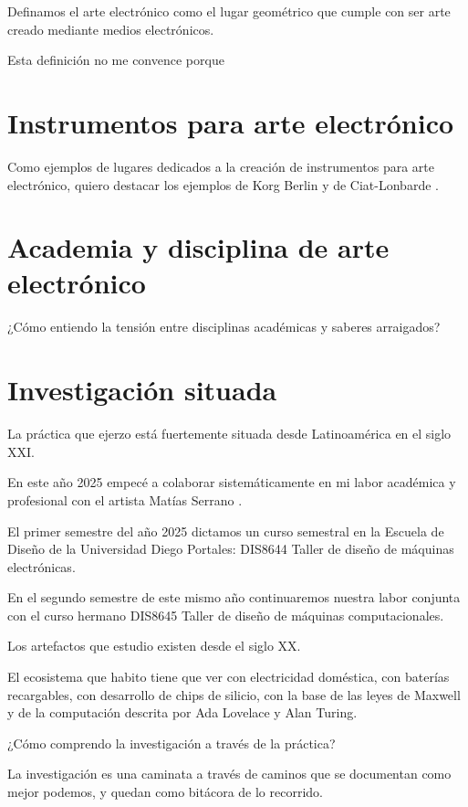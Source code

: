 \documentclass{article}
\begin{document}
Definamos el arte electrónico como el lugar geométrico que cumple con ser arte creado mediante medios electrónicos.

Esta definición no me convence porque 


\section{Instrumentos para arte electrónico}

Como ejemplos de lugares dedicados a la creación de instrumentos para arte electrónico, quiero destacar los ejemplos de Korg Berlin \cite{korgBerlin} y de Ciat-Lonbarde \cite{ciatLonbarde}.

\section{Academia y disciplina de arte electrónico}

¿Cómo entiendo la tensión entre disciplinas académicas y saberes arraigados?

\section{Investigación situada}

La práctica que ejerzo está fuertemente situada desde Latinoamérica en el siglo XXI.

En este año 2025 empecé a colaborar sistemáticamente en mi labor académica y profesional con el artista Matías Serrano \cite{misaa}.

El primer semestre del año 2025 dictamos un curso semestral en la Escuela de Diseño de la Universidad Diego Portales: DIS8644 Taller de diseño de máquinas electrónicas.

En el segundo semestre de este mismo año continuaremos nuestra labor conjunta con el curso hermano DIS8645 Taller de diseño de máquinas computacionales.



Los artefactos que estudio existen desde el siglo XX.

El ecosistema que habito tiene que ver con electricidad doméstica, con baterías recargables, con desarrollo de chips de silicio, con la base de las leyes de Maxwell y de la computación descrita por Ada Lovelace y Alan Turing.

¿Cómo comprendo la investigación a través de la práctica?

La investigación es una caminata a través de caminos que se documentan como mejor podemos, y quedan como bitácora de lo recorrido.
\end{document}
